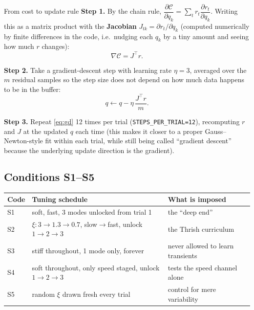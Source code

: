 \documentclass[11pt,a4paper]{article}
\begin{document}
\begin{stepbox}{From cost to update rule}
\textbf{Step 1.} By the chain rule, $\dfrac{\partial\mathcal C}{\partial
q_k}=\sum_t r_t\dfrac{\partial r_t}{\partial q_k}$. Writing this as a matrix
product with the \textbf{Jacobian} $J_{tk}=\partial r_t/\partial q_k$
(computed numerically by finite differences in the code, i.e.\ nudging each
$q_k$ by a tiny amount and seeing how much $r$ changes):
\[
\nabla\mathcal C = J^\top r.
\]

\textbf{Step 2.} Take a gradient-descent step with learning rate $\eta=3$,
averaged over the $m$ residual samples so the step size does not depend on
how much data happens to be in the buffer:
\begin{equation}
q \leftarrow q - \eta\,\frac{J^\top r}{m}.
\label{eq:gd}
\end{equation}

\textbf{Step 3.} Repeat \eqref{eq:gd} 12 times per trial
(\texttt{STEPS\_PER\_TRIAL=12}), recomputing $r$ and $J$ at the updated $q$
each time (this makes it closer to a proper Gauss--Newton-style fit within
each trial, while still being called ``gradient descent'' because the
underlying update direction is the gradient).
\end{stepbox}

\subsection{Conditions S1--S5}

\begin{center}
\small
\begin{tabular}{@{}llp{6.5cm}@{}}
\toprule
\textbf{Code} & \textbf{Tuning schedule} & \textbf{What is imposed} \\
\midrule
S1 & soft, fast, 3 modes unlocked from trial 1 & the ``deep end'' \\
S2 & $\xi:3\to1.3\to0.7$, slow$\to$fast, unlock $1\to2\to3$ & the Thrish curriculum \\
S3 & stiff throughout, 1 mode only, forever & never allowed to learn transients \\
S4 & soft throughout, only speed staged, unlock $1\to2\to3$ & tests the speed channel alone \\
S5 & random $\xi$ drawn fresh every trial & control for mere variability \\
\bottomrule
\end{tabular}
\end{center}
\end{document}
